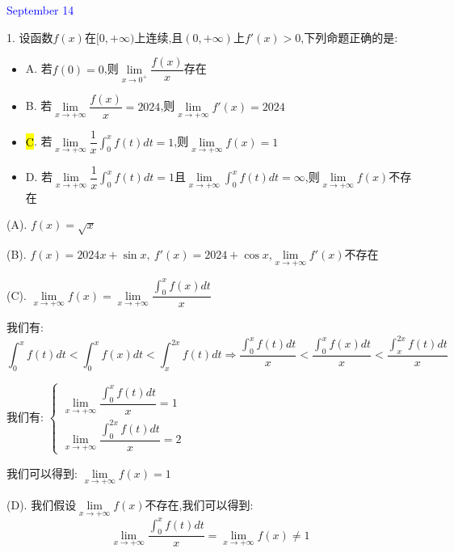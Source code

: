 \textcolor{blue}{September 14}

1. 设函数$f(x)$在$[0,+\infty)$上连续,且$(0,+\infty)$上$f'(x)>0$,下列命题正确的是:  
\begin{itemize}
	\item A. 若$f(0)=0$,则$\lim\limits_{x\to 0^{+}}\dfrac{f(x)}{x}$存在
	\item B. 若$\lim\limits_{x\to+\infty}\dfrac{f(x)}{x}=2024$,则$\lim\limits_{x\to +\infty}f'(x)=2024$
	\item \hl{C}. 若$\lim\limits_{x\to+\infty}\dfrac{1}{x}\int_{0}^{x}f(t)dt=1$,则$\lim\limits_{x\to +\infty}f(x)=1$
	\item D. 若$\lim\limits_{x\to+\infty}\dfrac{1}{x}\int_{0}^{x}f(t)dt=1$且$\lim\limits_{x\to+\infty}\int_{0}^{x}f(t)dt=\infty$,则$\lim\limits_{x\to+\infty}f(x)$不存在
\end{itemize}
\begin{solution}

	(A). $f(x)=\sqrt{x}$
	
	(B). $f(x)=2024x+\sin x,\ f'(x)=2024+\cos x$,$\lim\limits_{x\to +\infty}f'(x)\text{不存在}$
	
	(C). $\lim\limits_{x\to +\infty}f(x)=\lim\limits_{x\to+\infty}\dfrac{\int_{0}^{x}f(x)dt}{x}$
	
	我们有:  $$\int_{0}^{x}f(t)dt<\int_{0}^{x}f(x)dt<\int_{x}^{2x}f(t)dt\Rightarrow \dfrac{\int_{0}^{x}f(t)dt}{x}<\dfrac{\int_{0}^{x}f(x)dt}{x}<\dfrac{\int_{x}^{2x}f(t)dt}{x}$$
	
	我们有:  $\left\lbrace
	\begin{array}{l}
		\lim\limits_{x\to+\infty}\dfrac{\int_{0}^{x}f(t)dt}{x}=1\\
		\lim\limits_{x\to+\infty}\dfrac{\int_{0}^{2x}f(t)dt}{x}=2
	\end{array}
	\right. $
	
	我们可以得到:  $\lim\limits_{x\to +\infty}f(x)=1$
	
	(D). 我们假设$\lim\limits_{x\to +\infty}f(x)$不存在,我们可以得到:  
	$$\lim\limits_{x\to +\infty}\dfrac{\int_{0}^{x}f(t)dt}{x}=\lim\limits_{x\to+\infty}f(x)\neq 1$$
	
\end{solution}

